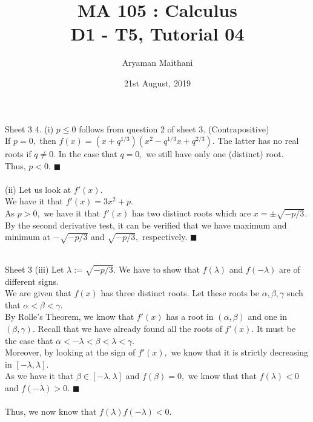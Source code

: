 \documentclass[handout, aspectratio=169]{beamer}
\title{MA 105 : Calculus\\ D1 - T5, Tutorial 04}  %
\author{Aryaman Maithani}
\date[21-08-2019]{21st August, 2019}               %
\institute[IITB]{IIT Bombay}
\begin{document}
\begin{frame}
	\titlepage
\end{frame}
\begin{frame}{Sheet 3}                            %
	4. (i) $p \le 0$ follows from question 2 of sheet 3. (Contrapositive)\\
	If $p = 0,$ then $f(x) = (x + q^{1/3})(x^2 - q^{1/3}x + q^{2/3}).$ The latter has no real roots if $q \neq 0.$ In the case that $q = 0,$ we still have only one (distinct) root.\\
	Thus, $p < 0.$ \hfill $\blacksquare$ \\~\\
	(ii) Let us look at $f'(x).$ \\
	We have it that $f'(x) = 3x^2 + p.$\\
	As $p > 0,$ we have it that $f'(x)$ has two distinct roots which are $x = \pm \sqrt{-p/3}.$\\
	By the second derivative test, it can be verified that we have maximum and minimum at $-\sqrt{-p/3}$ and $\sqrt{-p/3},$ respectively. \hfill $\blacksquare$ \\~\\
\end{frame}
\begin{frame}{Sheet 3}
	(iii) Let $\lambda := \sqrt{-p/3}.$ We have to show that $f(\lambda)$ and $f(-\lambda)$ are of different signs.\\
	We are given that $f(x)$ has three distinct roots. Let these roots be $\alpha, \beta, \gamma$ such that $\alpha < \beta < \gamma.$\\
	By Rolle's Theorem, we know that $f'(x)$ has a root in $(\alpha, \beta)$ and one in $(\beta, \gamma).$ Recall that we have already found all the roots of $f'(x).$ It must be the case that $\alpha < -\lambda < \beta < \lambda < \gamma.$\\
	Moreover, by looking at the sign of $f'(x),$ we know that it is strictly decreasing in $[-\lambda, \lambda].$\\
	As we have it that $\beta \in [-\lambda, \lambda]$ and $f(\beta) = 0,$ we know that that $f(\lambda) < 0$ and $f(-\lambda) > 0.$ \hfill $\blacksquare$\\~\\
	Thus, we now know that $f(\lambda)f(-\lambda) < 0.$
\end{frame}
\end{document}
